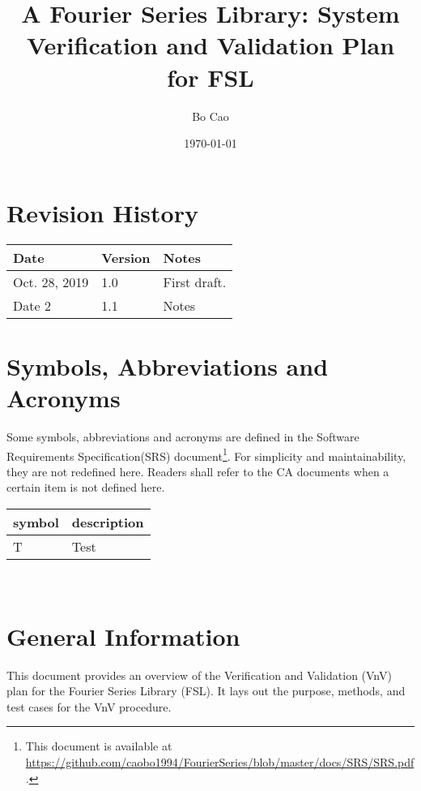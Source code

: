 \documentclass[12pt, titlepage]{article}
\begin{document}
\title{A Fourier Series Library: System Verification and Validation Plan for FSL} 
\author{Bo Cao}
\date{\today}
	
\maketitle


\section{Revision History}

\begin{tabularx}{\textwidth}{p{3cm}p{2cm}X}
\toprule {\bf Date} & {\bf Version} & {\bf Notes}\\
\midrule
Oct. 28, 2019  & 1.0 & First draft.\\
Date 2 & 1.1 & Notes\\
\bottomrule
\end{tabularx}

\newpage

\tableofcontents

\newpage

\section{Symbols, Abbreviations and Acronyms}

Some symbols, abbreviations and acronyms are defined in the Software Requirements Specification(SRS)
document\footnote{This document is available at
\url{https://github.com/caobo1994/FourierSeries/blob/master/docs/SRS/SRS.pdf}.}. For
simplicity and maintainability, they are not redefined here. Readers shall refer
to the CA documents when a certain item is not defined here.

\vspace{1cm}

\renewcommand{\arraystretch}{1.2}
\begin{tabular}{l l} 
  \toprule		
  \textbf{symbol} & \textbf{description}\\
  \midrule 
  T & Test\\
  \bottomrule
\end{tabular}\\

\newpage



\section{General Information} This document provides an overview of the
Verification and Validation (VnV) plan for the Fourier Series Library (FSL). It
lays out the purpose, methods, and test cases for the VnV procedure.
\end{document}
